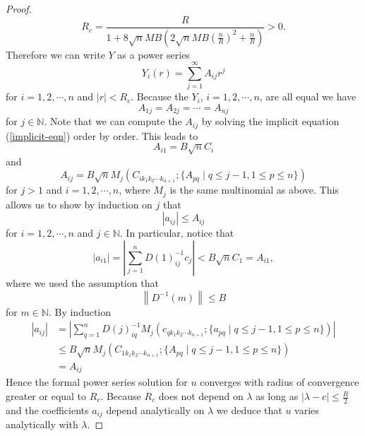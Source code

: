 \documentclass{amsart}
\theoremstyle{definition}
\theoremstyle{remark}
\numberwithin{equation}{section}
\newcommand{\N}{\mathbb{N}}
\newcommand{\norm}[1]{\left\lVert#1\right\rVert}
\begin{document}
\begin{proof}
\begin{equation*}
R_c = \frac{R}{1+ 8 \sqrt{n}MB \left(2 \sqrt{n} MB \left(\frac{n}{R}\right)^2 + \frac{n}{R}\right)} > 0.
\end{equation*}
Therefore we can write $Y$ as a power series
\begin{equation*}
Y_i(r) = \sum_{j = 1}^{\infty} A_{ij} r^j
\end{equation*}
for $i = 1, 2, \cdots, n$ and $|r| < R_c$. Because the $Y_i$, $i = 1, 2, \cdots, n$, are all equal we have
\begin{equation*}
A_{1j} = A_{2j} = \cdots = A_{nj}
\end{equation*}
for $j \in \N$. Note that we can compute the $A_{ij}$ by solving the implicit equation (\ref{implicit-eqn}) order by order. This leads to
\begin{equation*}
A_{i1} = B\sqrt{n} C_{i}
\end{equation*}
and
\begin{equation*}
A_{ij} = B\sqrt{n} M_j(C_{ik_1k_2 \cdots k_{n+1}}; \{A_{pq}\; |\; q \leq j-1,  1 \leq p \leq n \} )
\end{equation*}
for $j >1$ and $i = 1, 2, \cdots, n$, where $M_j$ is the same multinomial as above. This allows us to show by induction on $j$ that
\begin{equation*}
|a_{ij}| \leq A_{ij}
\end{equation*}
for $i = 1, 2, \cdots, n$ and $j \in \N$. In particular, notice that 
\begin{equation*}
|a_{i1}| = |\sum_{j=1}^n D(1)^{-1}_{ij} c_{j}| < B \sqrt{n}C_{1} = A_{i1},
\end{equation*}
where we used the assumption that
\begin{equation*}
\norm{D^{-1}(m)} \leq B
\end{equation*}
for $m\in \N$. By induction
\begin{align*}
|a_{ij}| &=  \left| \sum_{q=1}^n D(j)^{-1}_{iq}  M_j(c_{qk_1k_2 \cdots k_{n+1}}; \{a_{pq}\; |\; q \leq j-1,  1 \leq p \leq n \})\right| \\
		 &\leq  B \sqrt{n} M_j(C_{1k_1k_2 \cdots k_{n+1}}; \{A_{pq}\; |\; q \leq j-1,  1 \leq p \leq n \} ) \\
		 & = A_{ij}
\end{align*}
Hence the formal power series solution for $u$ converges with radius of convergence greater or equal to $R_c$. Because $R_c$ does not depend on $\lambda$ as long as $|\lambda - c| \leq \frac{R}{2}$ and the coefficients $a_{ij}$ depend analytically on $\lambda$ we deduce that $u$ varies analytically with $\lambda$. 
\end{proof}
\end{document}
